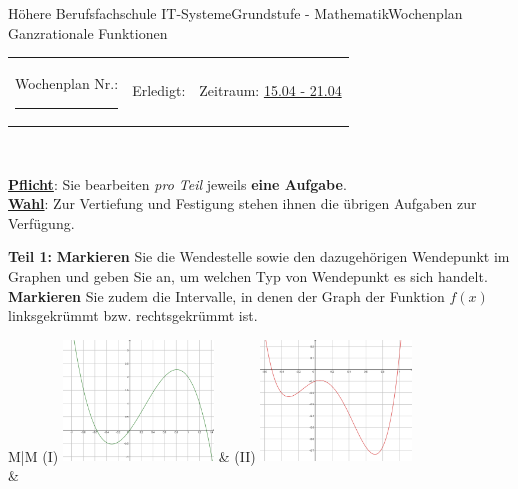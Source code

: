 \documentclass[oneside,openany,headings=optiontotoc,11pt,numbers=noenddot]{scrreprt}
\begin{document}
	\begin{worksheet}{Höhere Berufsfachschule IT-Systeme}{Grundstufe - Mathematik}{Wochenplan Ganzrationale Funktionen}
		\noindent
		\begin{tabularx}{\textwidth}{XXl}
			Wochenplan Nr.: \rule{0.15\textwidth}{1pt} & Erledigt: & Zeitraum: \underline{15.04 - 21.04}
		\end{tabularx}\\
		\par\noindent
		\textbf{\underline{Pflicht}}: Sie bearbeiten \textit{pro Teil} jeweils \textbf{eine Aufgabe}.\\
		\underline{\textbf{Wahl}}: Zur Vertiefung und Festigung stehen ihnen die übrigen Aufgaben zur Verfügung.
		\begin{framed}
			\noindent
			\textbf{Teil 1:} \textbf{Markieren} Sie die Wendestelle sowie den dazugehörigen Wendepunkt im Graphen und geben Sie an, um welchen Typ von Wendepunkt es sich handelt.\\
			\textbf{Markieren} Sie zudem die Intervalle, in denen der Graph der Funktion \(f(x)\) linksgekrümmt bzw. rechtsgekrümmt ist.\\
			\par\noindent
			\begin{tabularx}{\textwidth}{M|M}
				(I) \includegraphics[width=0.3\textwidth,align=c]{../99_Bilder/WP/WP15_T11.png} & (II) \includegraphics[width=0.3\textwidth,align=c]{../99_Bilder/WP/WP15_T12.png}\\
				& \\
				\hline
				\\

\end{tabularx}
\end{framed}
\end{worksheet}
\end{document}
